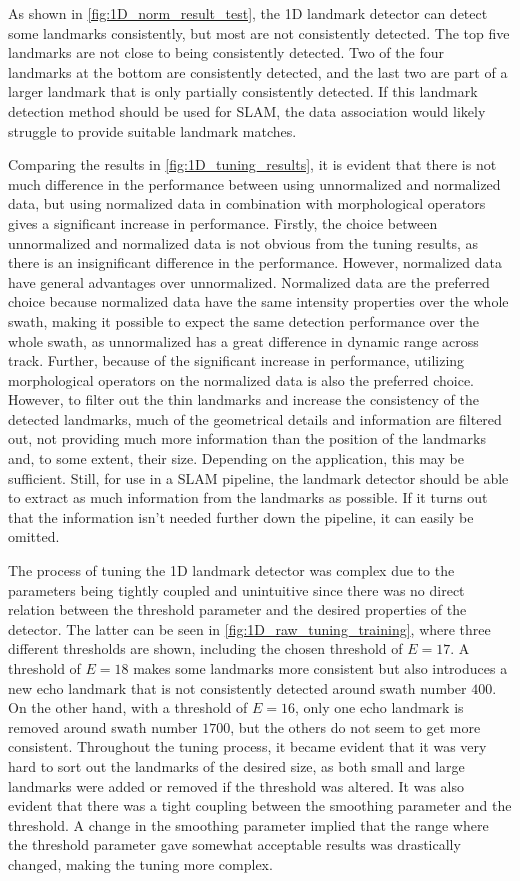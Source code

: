 As shown in \cref{fig:1D_norm_result_test}, the 1D landmark detector can detect some landmarks consistently, but most are not consistently detected. The top five landmarks are not close to being consistently detected. Two of the four landmarks at the bottom are consistently detected, and the last two are part of a larger landmark that is only partially consistently detected. If this landmark detection method should be used for SLAM, the data association would likely struggle to provide suitable landmark matches. 

Comparing the results in \cref{fig:1D_tuning_results}, it is evident that there is not much difference in the performance between using unnormalized and normalized data, but using normalized data in combination with morphological operators gives a significant increase in performance. Firstly, the choice between unnormalized and normalized data is not obvious from the tuning results, as there is an insignificant difference in the performance. However, normalized data have general advantages over unnormalized. Normalized data are the preferred choice because normalized data have the same intensity properties over the whole swath, making it possible to expect the same detection performance over the whole swath, as unnormalized has a great difference in dynamic range across track. Further, because of the significant increase in performance, utilizing morphological operators on the normalized data is also the preferred choice. However, to filter out the thin landmarks and increase the consistency of the detected landmarks, much of the geometrical details and information are filtered out, not providing much more information than the position of the landmarks and, to some extent, their size. Depending on the application, this may be sufficient. Still, for use in a SLAM pipeline, the landmark detector should be able to extract as much information from the landmarks as possible. If it turns out that the information isn't needed further down the pipeline, it can easily be omitted. 

The process of tuning the 1D landmark detector was complex due to the parameters being tightly coupled and unintuitive since there was no direct relation between the threshold parameter and the desired properties of the detector. The latter can be seen in \cref{fig:1D_raw_tuning_training}, where three different thresholds are shown, including the chosen threshold of $E = 17$. A threshold of $E = 18$ makes some landmarks more consistent but also introduces a new echo landmark that is not consistently detected around swath number $400$. On the other hand, with a threshold of $E = 16$, only one echo landmark is removed around swath number $1700$, but the others do not seem to get more consistent. Throughout the tuning process, it became evident that it was very hard to sort out the landmarks of the desired size, as both small and large landmarks were added or removed if the threshold was altered. It was also evident that there was a tight coupling between the smoothing parameter and the threshold. A change in the smoothing parameter implied that the range where the threshold parameter gave somewhat acceptable results was drastically changed, making the tuning more complex. 

